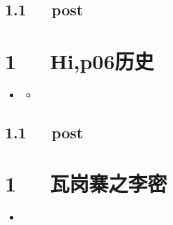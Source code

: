 \documentclass[letterpaper,10pt,english]{sphinxmanual}
\begin{document}
\section{1.1   post}
\label{\detokenize{p05_u6280_u672f/Hello_uff0cp05_u6280_u672f:post}}

\chapter{1   Hi,p06历史}
\label{\detokenize{p06_u5386_u53f2/Hello_uff0cp06_u5386_u53f2:hi-p06}}\label{\detokenize{p06_u5386_u53f2/Hello_uff0cp06_u5386_u53f2::doc}}
\begin{sphinxShadowBox}
\begin{itemize}
\item {} 
\label{\detokenize{p06_u5386_u53f2/Hello_uff0cp06_u5386_u53f2:id2}}{\hyperref[\detokenize{p06_u5386_u53f2/Hello_uff0cp06_u5386_u53f2:hi-p06}]{}}
\begin{itemize}
\item {} 
\label{\detokenize{p06_u5386_u53f2/Hello_uff0cp06_u5386_u53f2:id3}}{\hyperref[\detokenize{p06_u5386_u53f2/Hello_uff0cp06_u5386_u53f2:post}]{}}

\end{itemize}

\end{itemize}
\end{sphinxShadowBox}


\section{1.1   post}
\label{\detokenize{p06_u5386_u53f2/Hello_uff0cp06_u5386_u53f2:post}}

\chapter{1   瓦岗寨之李密}
\label{\detokenize{p06_u5386_u53f2/_u74e6_u5c97_u5be8_u4e4b_u674e_u5bc6:id1}}\label{\detokenize{p06_u5386_u53f2/_u74e6_u5c97_u5be8_u4e4b_u674e_u5bc6::doc}}
\begin{sphinxShadowBox}
\begin{itemize}
\item {} 
\label{\detokenize{p06_u5386_u53f2/_u74e6_u5c97_u5be8_u4e4b_u674e_u5bc6:id3}}{\hyperref[\detokenize{p06_u5386_u53f2/_u74e6_u5c97_u5be8_u4e4b_u674e_u5bc6:id1}]{}}

\end{itemize}
\end{sphinxShadowBox}
\end{document}
